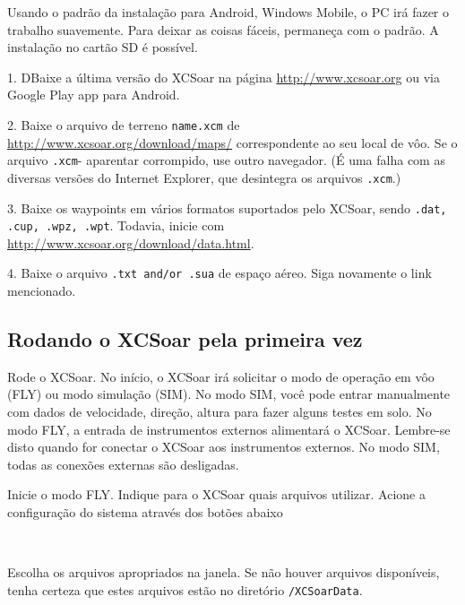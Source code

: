 \documentclass[a4paper,12pt,utf8]{scrreprt}
\newcommand{\config}[3]{\bmenut{Config}{#1/3}{\LARGE$\triangleright$}~\bmenut{#2}{#3}}%
\begin{document}
Usando o padrão da instalação para Android, Windows Mobile, o PC irá fazer o trabalho suavemente.  Para deixar as coisas fáceis, permaneça com o padrão.  A instalação no cartão SD é possível.

\begin{compactitem}
\item[1.] DBaixe a última versão do XCSoar na página 
{\url{http://www.xcsoar.org}} ou via Google Play app para Android.
\item[2.] Baixe o arquivo de terreno \texttt{name.xcm} de 
{\url{http://www.xcsoar.org/download/maps/}}
correspondente ao seu local de vôo.  Se o arquivo \texttt{.xcm}- aparentar corrompido, use outro navegador. (É uma falha com as diversas versões do Internet Explorer, que desintegra os arquivos \texttt{.xcm}.)
\item[3.] Baixe os waypoints em vários formatos suportados pelo XCSoar, sendo \texttt{.dat, .cup, .wpz, .wpt}. Todavia, inicie com {\url{http://www.xcsoar.org/download/data.html}}.
\item[4.] Baixe o arquivo \texttt{.txt and/or .sua} de espaço aéreo.  Siga novamente o link mencionado.
\end{compactitem}

\subsection{\textcolor{flashblue}{Rodando o XCSoar pela primeira vez}}
Rode o XCSoar.  No início, o XCSoar irá solicitar o modo de operação em vôo (FLY) ou modo simulação (SIM).  No modo SIM, você pode entrar manualmente com dados de velocidade, direção, altura para fazer alguns testes em solo.  No modo FLY, a entrada de instrumentos externos alimentará o XCSoar.  Lembre-se disto quando for conectar o XCSoar aos instrumentos externos.  No modo SIM, todas as conexões externas são desligadas.

Inicie o modo FLY.  Indique para o XCSoar quais arquivos utilizar.  Acione a configuração do sistema através dos botões abaixo

\begin{flushleft}\hspace*{1cm}\config{2}{Sistema}{}\blink{}
\blink{}\\\end{flushleft}

Escolha os arquivos apropriados na janela.  Se não houver arquivos disponíveis, tenha certeza que estes arquivos estão no diretório \texttt{/XCSoarData}.
\end{document}

